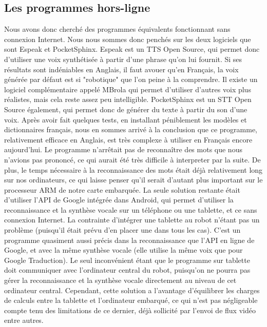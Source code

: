 \documentclass[a4paper,10pt]{report}
\begin{document}
      \subsection{Les programmes hors-ligne}
      {Nous avons donc cherché des programmes équivalents fonctionnant sans connexion Internet. Nous nous sommes donc penchés sur les deux logiciels que sont Espeak et PocketSphinx.}
      {Espeak est un TTS Open Source, qui permet donc d'utiliser une voix synthétisée à partir d'une phrase qu'on lui fournit. Si ses résultats sont indéniables en Anglais, il faut avouer qu'en Français, la voix générée par défaut est si "robotique" que l'on peine à la comprendre. Il existe un logiciel complémentaire appelé MBrola qui permet d'utiliser d'autres voix plus réalistes, mais cela reste assez peu intelligible.}
      {PocketSphinx est un STT Open Source également, qui permet donc de générer du texte à partir du son d'une voix. Après avoir fait quelques tests, en installant péniblement les modèles et dictionnaires français, nous en sommes arrivé à la conclusion que ce programme, relativement efficace en Anglais, est très complexe à utiliser en Français encore aujourd'hui. Le programme n'arrêtait pas de reconnaître des mots que nous n'avions pas prononcé, ce qui aurait été très difficile à interpreter par la suite. De plus, le temps nécessaire à la reconnaissance des mots était déjà relativement long sur nos ordinateurs, ce qui laisse penser qu'il serait d'autant plus important sur le processeur ARM de notre carte embarquée.\newline}
      {La seule solution restante était d'utiliser l'API de Google intégrée dans Android, qui permet d'utiliser la reconnaissance et la synthèse vocale sur un téléphone ou une tablette, et ce sans connexion Internet. La contrainte d'intégrer une tablette au robot n'étant pas un problème (puisqu'il était prévu d'en placer une dans tous les cas). C'est un programme quasiment aussi précis dans la reconnaissance que l'API en ligne de Google, et avec la même synthèse vocale (elle utilise la même voix que pour Google Traduction). Le seul inconvénient étant que le programme sur tablette doit communiquer avec l'ordinateur central du robot, puisqu'on ne pourra pas gérer la reconnaissance et la synthèse vocale directement au niveau de cet ordinateur central. Cependant, cette solution a l'avantage d'équilibrer les charges de calculs entre la tablette et l'ordinateur embarqué, ce qui n'est pas négligeable compte tenu des limitations de ce dernier, déjà sollicité par l'envoi de flux vidéo entre autres.}
\end{document}
